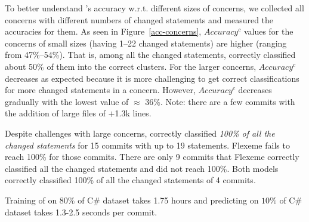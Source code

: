 
\vspace{3pt}
 To better
understand {\tool}'s accuracy w.r.t. different sizes of concerns, we
collected all concerns with different numbers of changed statements
and measured the accuracies for them.  As seen in
Figure~\ref{acc-concerns}, $Accuracy^{c}$ values for the concerns of
small sizes (having 1--22 changed statements) are higher (ranging from
47\%--54\%). That is, among all the changed statements, {\tool}
correctly classified about 50\% of them into the correct clusters.
For the larger concerns, $Accuracy^{c}$ decreases as expected because
it is more challenging to get correct classifications for more changed
statements in a concern. However, $Accuracy^{c}$ decreases gradually
with the lowest value of $\approx$ 36\%. Note: there are a few commits
with the addition of large files of $+$1.3k lines.

Despite challenges with large concerns, {\tool} correctly classified
{\em 100\% of all the changed statements} for 15 commits with up to 19
statements. Flexeme fails to reach 100\% for those commits. There are
only 9 commits that Flexeme correctly classified all the changed
statements and {\tool} did not reach 100\%. Both models correctly
classified 100\% of all the changed statements of 4 commits.

       










Training of \tool on $80\%$ of C\# dataset takes 1.75 hours and
predicting on $10\%$ of C\# dataset takes 1.3-2.5 seconds per commit.
